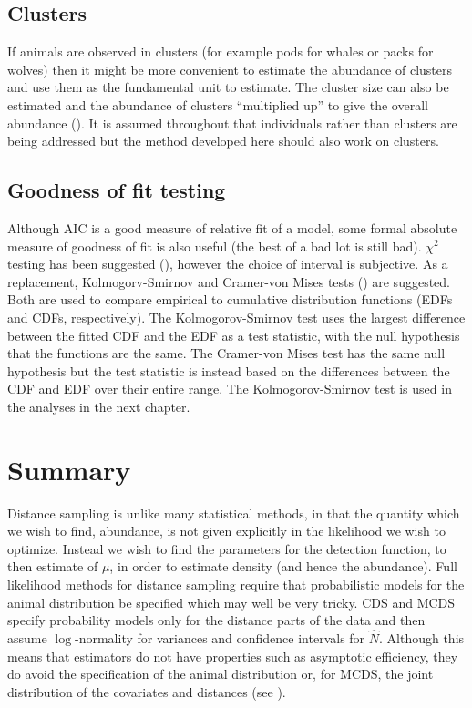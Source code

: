 \subsection{Clusters}
If animals are observed in clusters (for example pods for whales or packs for wolves) then it might be more convenient to estimate the abundance of clusters and use them as the fundamental unit to estimate. The cluster size can also be estimated and the abundance of clusters ``multiplied up'' to give the overall abundance (\cite[p. 13]{IDS}). It is assumed throughout that individuals rather than clusters are being addressed but the method developed here should also work on clusters.

\subsection{Goodness of fit testing}
Although AIC is a good measure of relative fit of a model, some formal absolute measure of goodness of fit is also useful (the best of a bad lot is still bad). $\chi^2$ testing has been suggested (\cite[pp. 69-71]{IDS}), however the choice of interval is subjective. As a replacement, Kolmogorv-Smirnov and Cramer-von Mises tests (\cite[pp. 385-389]{ADS}) are suggested. Both are used to compare empirical to cumulative distribution functions (EDFs and CDFs, respectively). The Kolmogorov-Smirnov test uses the largest difference between the fitted CDF and the EDF as a test statistic, with the null hypothesis that the functions are the same. The Cramer-von Mises test has the same null hypothesis but the test statistic is instead based on the differences between the CDF and EDF over their entire range. The Kolmogorov-Smirnov test is used in the analyses in the next chapter.

\section{Summary}
Distance sampling is unlike many statistical methods, in that the quantity which we wish to find, abundance, is not given explicitly in the likelihood we wish to optimize. Instead we wish to find the parameters for the detection function, to then estimate of $\mu$, in order to estimate density (and hence the abundance). Full likelihood methods for distance sampling require that probabilistic models for the animal distribution be specified which may well be very tricky. CDS and MCDS specify probability models only for the distance parts of the data and then assume $\log$-normality for variances and confidence intervals for $\hat{N}$. Although this means that estimators do not have  properties such as asymptotic efficiency, they do avoid the specification of the animal distribution or, for MCDS, the joint distribution of the covariates and distances (see \cite[p. 6 and pp. 31-33]{ADS}). 

